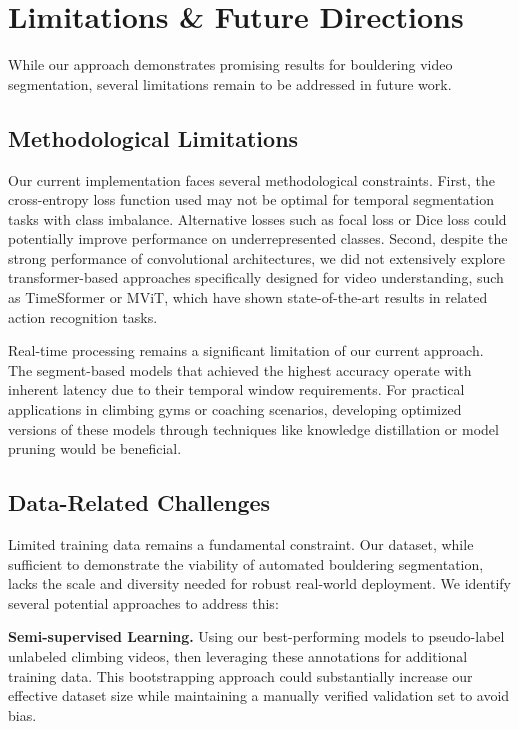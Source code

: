 \section{Limitations \& Future Directions}

While our approach demonstrates promising results for bouldering video segmentation, several limitations remain to be addressed in future work.

\subsection*{Methodological Limitations}
Our current implementation faces several methodological constraints. First, the cross-entropy loss function used may not be optimal for temporal segmentation tasks with class imbalance. Alternative losses such as focal loss or Dice loss could potentially improve performance on underrepresented classes. Second, despite the strong performance of convolutional architectures, we did not extensively explore transformer-based approaches specifically designed for video understanding, such as TimeSformer or MViT, which have shown state-of-the-art results in related action recognition tasks.

Real-time processing remains a significant limitation of our current approach. The segment-based models that achieved the highest accuracy operate with inherent latency due to their temporal window requirements. For practical applications in climbing gyms or coaching scenarios, developing optimized versions of these models through techniques like knowledge distillation or model pruning would be beneficial.

\subsection*{Data-Related Challenges}
Limited training data remains a fundamental constraint. Our dataset, while sufficient to demonstrate the viability of automated bouldering segmentation, lacks the scale and diversity needed for robust real-world deployment. We identify several potential approaches to address this:

\noindent\textbf{Semi-supervised Learning.}
Using our best-performing models to pseudo-label unlabeled climbing videos, then leveraging these annotations for additional training data. This bootstrapping approach could substantially increase our effective dataset size while maintaining a manually verified validation set to avoid bias.

